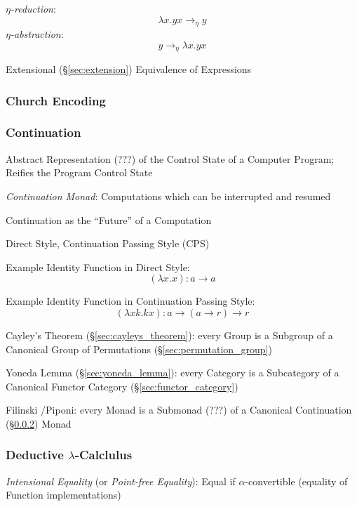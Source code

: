 \emph{$\eta$-reduction}:
\[
  \lambda x.y x \rightarrow_\eta y
\]
\emph{$\eta$-abstraction}:
\[
  y \rightarrow_\eta \lambda x.y x
\]

Extensional (\S\ref{sec:extension}) Equivalence of Expressions



\subsubsection{Church Encoding}\label{sec:church_encoding}

\subsubsection{Continuation}\label{sec:continuation}

Abstract Representation (???) of the Control State of a Computer
Program; Reifies the Program Control State

\emph{Continuation Monad}: Computations which can be interrupted and
resumed

Continuation as the ``Future'' of a Computation

Direct Style, Continuation Passing Style (CPS)

Example Identity Function in Direct Style:
\[
  (\lambda x . x) : a \rightarrow a
\]

Example Identity Function in Continuation Passing Style:
\[
  (\lambda x k.k x) : a \rightarrow (a \rightarrow r) \rightarrow r
\]

Cayley's Theorem (\S\ref{sec:cayleys_theorem}): every Group is a
Subgroup of a Canonical Group of Permutations
(\S\ref{sec:permutation_group})

Yoneda Lemma (\S\ref{sec:yoneda_lemma}): every Category is a
Subcategory of a Canonical Functor Category
(\S\ref{sec:functor_category})

Filinski \cite{filinski99}/Piponi: every Monad is a Submonad (???) of
a Canonical Continuation (\S\ref{sec:continuation}) Monad



\subsubsection{Deductive $\lambda$-Calclulus}\label{sec:deductive_lambda}

\emph{Intensional Equality} (or \emph{Point-free Equality}): Equal if
$\alpha$-convertible (equality of Function implementations)

